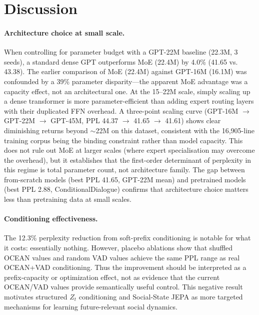 \documentclass[11pt]{article}
\begin{document}
\section{Discussion}
\label{sec:discussion}

\paragraph{Architecture choice at small scale.}
When controlling for parameter budget with a GPT-22M baseline (22.3M, 3 seeds), a standard dense GPT outperforms MoE (22.4M) by 4.0\% (41.65 vs. 43.38).
The earlier comparison of MoE (22.4M) against GPT-16M (16.1M) was confounded by a 39\% parameter disparity---the apparent MoE advantage was a capacity effect, not an architectural one.
At the 15--22M scale, simply scaling up a dense transformer is more parameter-efficient than adding expert routing layers with their duplicated FFN overhead.
A three-point scaling curve (GPT-16M $\to$ GPT-22M $\to$ GPT-45M, PPL 44.37 $\to$ 41.65 $\to$ 41.61) shows clear diminishing returns beyond $\sim$22M on this dataset, consistent with the 16,905-line training corpus being the binding constraint rather than model capacity.
This does not rule out MoE at larger scales (where expert specialisation may overcome the overhead), but it establishes that the first-order determinant of perplexity in this regime is total parameter count, not architecture family.
The gap between from-scratch models (best PPL 41.65, GPT-22M mean) and pretrained models (best PPL 2.88, ConditionalDialogue) confirms that architecture choice matters less than pretraining data at small scales.

\paragraph{Conditioning effectiveness.}
The 12.3\% perplexity reduction from soft-prefix conditioning is notable for what it costs: essentially nothing.
However, placebo ablations show that shuffled OCEAN values and random VAD values achieve the same PPL range as real OCEAN+VAD conditioning.
Thus the improvement should be interpreted as a prefix-capacity or optimization effect, not as evidence that the current OCEAN/VAD values provide semantically useful control.
This negative result motivates structured $Z_t$ conditioning and Social-State JEPA as more targeted mechanisms for learning future-relevant social dynamics.
\end{document}
